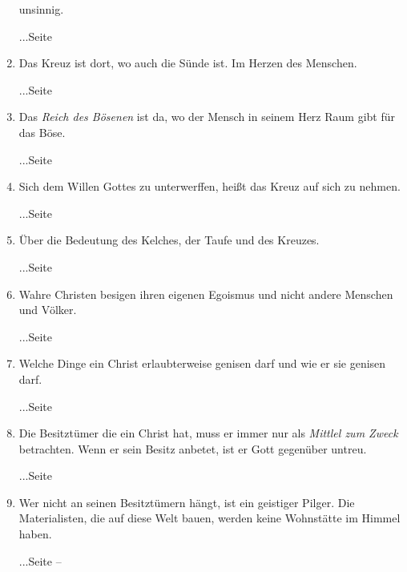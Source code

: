 \begin{enumerate}
unsinnig.
 \begin{flushright}...Seite \pageref{ref:03_02_leidenschaft}\end{flushright}
 \item Das Kreuz ist dort, wo auch die Sünde ist. Im Herzen des Menschen.
 \begin{flushright}...Seite \pageref{ref:03_03_ort_des_kreuzes}\end{flushright}
 \item Das \textit{Reich des Bösenen} ist da, wo der Mensch in seinem Herz Raum
gibt für das Böse.
 \begin{flushright}...Seite \pageref{ref:03_04_reich_des_boesen}\end{flushright}
 \item Sich dem Willen Gottes zu unterwerffen, heißt das Kreuz auf sich zu
nehmen.
 \begin{flushright}...Seite
\pageref{ref:03_05_kreuz_auf_sich_nehmen}\end{flushright}
 \item Über die Bedeutung des Kelches, der Taufe und des Kreuzes.
 \begin{flushright}...Seite
\pageref{ref:04_04_kelch_taufe_kreuz}\end{flushright}
 \item Wahre Christen besigen ihren eigenen Egoismus und nicht andere Menschen
und Völker.
 \begin{flushright}...Seite \pageref{ref:04_05_besigen}\end{flushright}
 \item Welche Dinge ein Christ erlaubterweise genisen darf und wie er sie
genisen darf.
 \begin{flushright}...Seite \pageref{ref:04_07_vorteile}\end{flushright}
 \item Die Besitztümer die ein Christ hat, muss er immer nur als \textit{Mittlel
zum Zweck} betrachten. Wenn er sein Besitz anbetet, ist er Gott gegenüber
untreu.
 \begin{flushright}...Seite \pageref{ref:04_07_vorteile}\end{flushright}
 \item Wer nicht an seinen Besitztümern hängt, ist ein geistiger Pilger. Die
Materialisten, die auf diese Welt bauen, werden keine Wohnstätte im Himmel
haben.
 \begin{flushright}...Seite \pageref{ref:04_10_pilger} --
\pageref{ref:04_10_pilger_ende}\end{flushright}

\end{enumerate}

